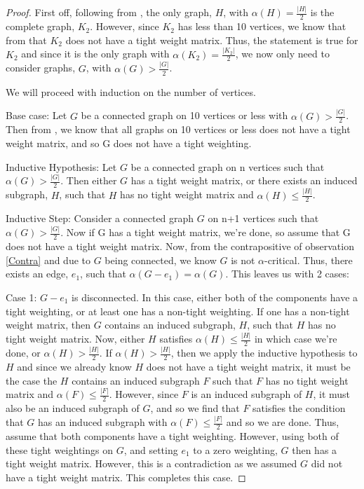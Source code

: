 \documentclass[12pt]{article}
\theoremstyle{parenbold}
\begin{document}
\begin{proof}

First off, following from \cite{plummer1970some}, the only graph, $H$, with $\alpha(H) = \frac{|H|}{2}$ is the complete graph, $K_2$. However, since $K_2$ has less than 10 vertices, we know that from \cite{elzinga2007minimum} that $K_2$ does not have a tight weight matrix. Thus, the statement is true for $K_2$ and since it is the only graph with $\alpha(K_2) = \frac{|K_2|}{2}$, we now only need to consider graphs, $G$, with $\alpha(G) > \frac{|G|}{2}$.

We will proceed with induction on the number of vertices.

Base case: Let $G$ be a connected graph on 10 vertices or less with $\alpha(G) > \frac{|G|}{2}$. Then from \cite{elzinga2007minimum}, we know that all graphs on 10 vertices or less does not have a tight weight matrix, and so G does not have a tight weighting.

Inductive Hypothesis: Let $G$ be a connected graph on n vertices such that $\alpha(G) > \frac{|G|}{2}$. Then either $G$ has a tight weight matrix, or there exists an induced subgraph, $H$, such that $H$ has no tight weight matrix and $\alpha(H) \leq \frac{|H|}{2}$.

Inductive Step: Consider a connected graph $G$ on n+1 vertices such that $\alpha(G) > \frac{|G|}{2}$. Now if G has a tight weight matrix, we're done, so assume that G does not have a tight weight matrix. Now, from the contrapositive of observation \ref{Contra} and due to $G$ being connected, we know $G$ is not $\alpha$-critical. Thus, there exists an edge, $e_1$, such that $\alpha(G-e_1) = \alpha(G)$. This leaves us with 2 cases:

Case 1: $G-e_1$ is disconnected. In this case, either both of the components have a tight weighting, or at least one has a non-tight weighting. If one has a non-tight weight matrix, then $G$ contains an induced subgraph, $H$, such that $H$ has no tight weight matrix. Now, either $H$ satisfies $\alpha(H) \leq \frac{|H|}{2}$ in which case we're done, or $\alpha(H) > \frac{|H|}{2}$. If $\alpha(H) > \frac{|H|}{2}$, then we apply the inductive hypothesis to $H$ and since we already know $H$ does not have a tight weight matrix, it must be the case the $H$ contains an induced subgraph $F$ such that $F$ has no tight weight matrix and $\alpha(F) \leq \frac{|F|}{2}$. However, since $F$ is an induced subgraph of $H$, it must also be an induced subgraph of $G$, and so we find that $F$ satisfies the condition that $G$ has an induced subgraph with $\alpha(F) \leq \frac{|F|}{2}$ and so we are done. Thus, assume that both components have a tight weighting. However, using both of these tight weightings on $G$, and setting $e_1$ to a zero weighting, $G$ then has a tight weight matrix. However, this is a contradiction as we assumed $G$ did not have a tight weight matrix. This completes this case.


\end{proof}
\end{document}
